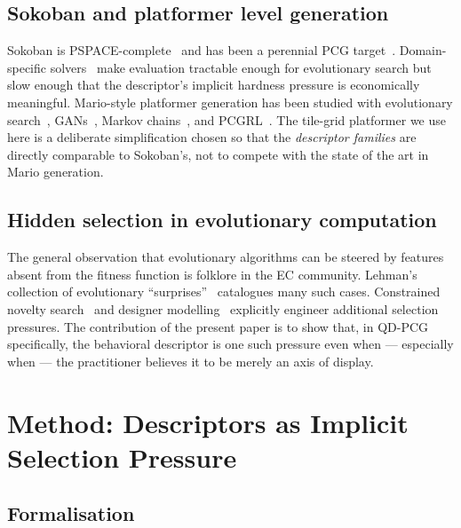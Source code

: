 \documentclass[conference]{IEEEtran}
\begin{document}
\subsection{Sokoban and platformer level generation}

Sokoban is PSPACE-complete~\cite{culberson1999sokoban} and has been
a perennial PCG target~\cite{taylor2011sokoban, murofushi2018sokoban,
kowalski2023sokoban}. Domain-specific solvers~\cite{junghanns2001sokoban}
make evaluation tractable enough for evolutionary search but slow
enough that the descriptor's implicit hardness pressure is
economically meaningful. Mario-style platformer generation has been
studied with evolutionary search~\cite{shaker2010mario},
GANs~\cite{volz2018evolving}, Markov chains~\cite{snodgrass2017markov},
and PCGRL~\cite{khalifa2020pcgrl}. The tile-grid platformer we use
here is a deliberate simplification chosen so that the
\emph{descriptor families} are directly comparable to Sokoban's, not
to compete with the state of the art in Mario generation.

\subsection{Hidden selection in evolutionary computation}

The general observation that evolutionary algorithms can be steered
by features absent from the fitness function is folklore in the EC
community. Lehman's collection of evolutionary
``surprises''~\cite{lehman2020surprising} catalogues many such
cases. Constrained novelty search~\cite{liapis2015constrained} and
designer modelling~\cite{liapis2014designer, holmgard2014personas}
explicitly engineer additional selection pressures. The contribution
of the present paper is to show that, in QD-PCG specifically, the
behavioral descriptor is one such pressure even when --- especially
when --- the practitioner believes it to be merely an axis of
display.

\section{Method: Descriptors as Implicit Selection Pressure}
\label{sec:method}

\subsection{Formalisation}
\end{document}
